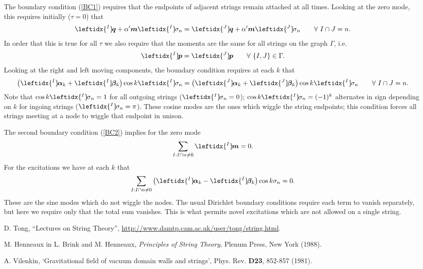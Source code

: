 \documentclass{revtex4}
\newcommand{\be}{\begin{eqnarray}}
\newcommand{\ee}{\end{eqnarray}}
\def\p{\bm{p}}
\def\q{\bm{q}}
\def\a{\bm{a}}
\def\m{\bm{m}}
\def\b{\bm{b}}
\def\lI{\leftidx{^I} \! }
\def\lJ{\leftidx{^J} \! }
\def\a{\bm{\alpha}}
\def\b{\bm{\beta}}
\begin{document}
The boundary condition (\ref{BC1}) requires that the endpoints of adjacent strings remain attached at all times. Looking at the zero mode, this requires initially ($\tau = 0$) that
\be
\lI \q + \alpha' \m \lI \sigma_n = \lJ \q + \alpha' \m \lJ \sigma_n \qquad \forall \ I \cap J = n .
\ee
In order that this is true for all $\tau$ we also require that the momenta are the same for all strings on the graph $\Gamma$, i.e. 
\be
\lI \p = \lJ \p \qquad \forall \ \{I, J\} \in \Gamma.
\ee
Looking at the right and left moving components, the boundary condition requires at each $k$ that
\be
\left( \lI \a_k + \lI \b_k \right) \cos k \lI \sigma_n = \left( \lJ \a_k  + \lJ \b_k \right) \cos k \lI \sigma_n \qquad \forall \ I \cap J = n.
\ee
Note that $\cos k \lI \sigma_n = 1$ for all outgoing strings ($\lI \sigma_n = 0$); $\cos k \lI \sigma_n = (-1)^k$ alternates in sign depending on $k$ for ingoing strings ($\lI \sigma_n = \pi$).
These cosine modes are the ones which wiggle the string endpoints; this condition forces all strings meeting at a node to wiggle that endpoint in unison.

The second boundary condition (\ref{BC2}) implies for the zero mode
\be
\sum_{I : I \cap n \ne 0} \lI \m = 0 .
\ee
For the excitations we have at each $k$ that
\be
\sum_{I : I \cap n \ne 0} \left( \lI \a_k - \lI \b_k \right)  \cos k \sigma_n = 0. 
\ee
These are the sine modes which do not wiggle the nodes. The usual Dirichlet boundary conditions require each term to vanish separately, but here we require only that the total sum vanishes. This is what permits novel excitations which are not allowed on a single string.


\begin{acknowledgments}
\end{acknowledgments}


\begin{thebibliography}{99}

 D. Tong, ``Lectures on String Theory'', \url{http://www.damtp.cam.ac.uk/user/tong/string.html}.

  M. Henneaux in L. Brink and M. Henneaux, {\it Principles of String Theory}, Plenum Press, New York (1988).

 A. Vilenkin, `Gravitational field of vacuum domain walls and strings', Phys. Rev. {\bf D23}, 852-857 (1981).

\end{thebibliography}
\end{document}
